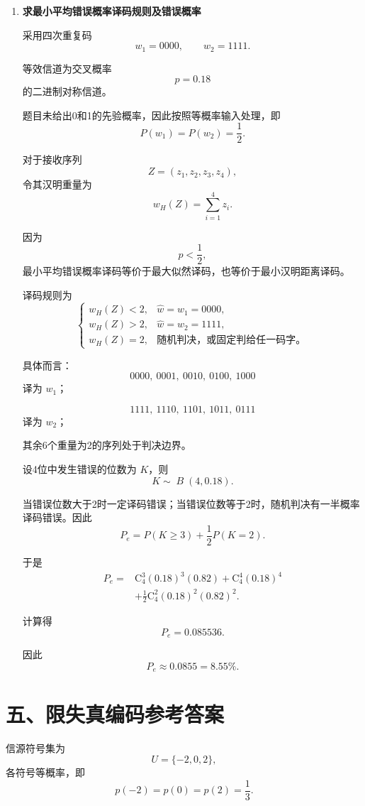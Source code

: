 \documentclass[UTF8,a4paper,12pt]{ctexart}
\begin{document}
\begin{enumerate}[label=\arabic*., leftmargin=2.2em]
保留到小数点后两位，
\[
\boxed{
C\approx0.32\ \text{bit/次信道使用}
}.
\]


\item \textbf{求最小平均错误概率译码规则及错误概率}

采用四次重复码
\[
w_1=0000,
\qquad
w_2=1111.
\]

等效信道为交叉概率
\[
p=0.18
\]
的二进制对称信道。

题目未给出0和1的先验概率，因此按照等概率输入处理，即
\[
P(w_1)=P(w_2)=\frac12.
\]

对于接收序列
\[
Z=(z_1,z_2,z_3,z_4),
\]
令其汉明重量为
\[
w_H(Z)=\sum_{i=1}^{4}z_i.
\]

因为
\[
p<\frac12,
\]
最小平均错误概率译码等价于最大似然译码，也等价于最小汉明距离译码。

译码规则为
\[
\boxed{
\begin{cases}
w_H(Z)<2,&\widehat w=w_1=0000,\\
w_H(Z)>2,&\widehat w=w_2=1111,\\
w_H(Z)=2,&\text{随机判决，或固定判给任一码字。}
\end{cases}
}
\]

具体而言：
\[
0000,\ 0001,\ 0010,\ 0100,\ 1000
\]
译为 $w_1$；

\[
1111,\ 1110,\ 1101,\ 1011,\ 0111
\]
译为 $w_2$；

其余6个重量为2的序列处于判决边界。

设4位中发生错误的位数为 $K$，则
\[
K\sim\operatorname{\textit{B}}(4,0.18).
\]

当错误位数大于2时一定译码错误；当错误位数等于2时，随机判决有一半概率译码错误。因此
\[
P_e
=
P(K\geq3)
+
\frac12P(K=2).
\]

于是
\[
\begin{aligned}
P_e
={}&
\mathrm{C}_4^3(0.18)^3(0.82)
+
\mathrm{C}_4^4(0.18)^4\\
&+
\frac12\mathrm{C}_4^2(0.18)^2(0.82)^2.
\end{aligned}
\]

计算得
\[
P_e=0.085536.
\]

因此
\[
\boxed{
P_e\approx0.0855=8.55\%
}.
\]

\end{enumerate}


\newpage

\section*{五、限失真编码参考答案}

信源符号集为
\[
U=\{-2,0,2\},
\]
各符号等概率，即
\[
p(-2)=p(0)=p(2)=\frac13.
\]
\end{document}
